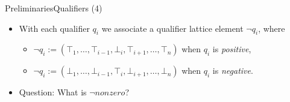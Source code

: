 \documentclass{beamer}
\begin{document}
\begin{frame}{Preliminaries}{Qualifiers (4)}
  \begin{itemize}
  \item With each qualifier $q_i$ we associate a qualifier lattice element $\neg q_i$, where
    \begin{itemize}
    \item[] $\neg q_i := (\top_1, \dots, \top_{i-1}, \bot_i, \top_{i+1}, \dots, \top_n)$ when $q_i$ is \emph{positive},
    \item[] $\neg q_i := (\bot_1, \dots, \bot_{i-1}, \top_i, \bot_{i+1}, \dots, \bot_n)$ when $q_i$ is \emph{negative}.
    \end{itemize}
  \item<2-> Question: What is $\neg nonzero$?\\
  \end{itemize}
\end{frame}

\end{document}
